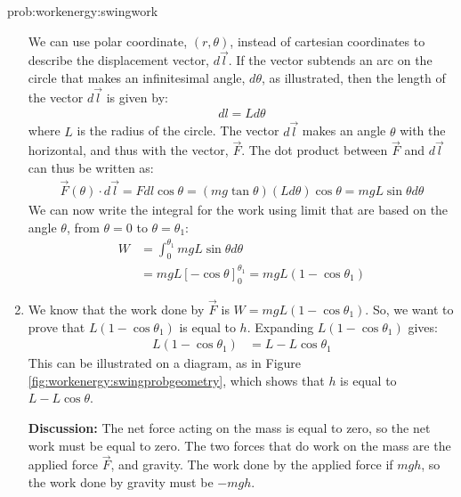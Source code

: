 \begin{solution}{prob:workenergy:swingwork}
\begin{enumerate}[label=\alph*)]
We can use polar coordinate, $(r,\theta)$, instead of cartesian coordinates to describe the displacement vector, $d\vec l$. If the vector subtends an arc on the circle that makes an infinitesimal angle, $d\theta$, as illustrated, then the length of the vector $d\vec l$ is given by:
\begin{align*}
dl = L d\theta
\end{align*}
where $L$ is the radius of the circle. The vector $d\vec l$ makes an angle $\theta$ with the horizontal, and thus with the vector, $\vec F$. The dot product between $\vec F$ and $d\vec l$ can thus be written as:
\begin{align*}
\vec F(\theta) \cdot d\vec l = Fdl\cos\theta=(mg\tan\theta)(Ld\theta)\cos\theta=mgL\sin\theta d\theta
\end{align*}
We can now write the integral for the work using limit that are based on the angle $\theta$, from $\theta=0$ to $\theta=\theta_1$:
\begin{align*}
W&=\int_0^{\theta_1}mgL\sin\theta d\theta\\
&=mgL[-\cos\theta]_0^{\theta_1}=mgL(1-\cos\theta_1)
\end{align*}

\item We know that the work done by $\vec F$ is $W=mgL(1-\cos\theta_1)$. So, we want to prove that $L(1-\cos\theta_1)$ is equal to $h$. Expanding $L(1-\cos\theta_1)$ gives:
\begin{align*}
L(1-\cos\theta_1)&=L-L\cos\theta_1
\end{align*}
This can be illustrated on a diagram, as in Figure \ref{fig:workenergy:swingprobgeometry}, which shows that $h$ is equal to $L-L\cos\theta$.

\textbf{Discussion:} The net force acting on the mass is equal to zero, so the net work must be equal to zero. The two forces that do work on the mass are the applied force $\vec F$, and gravity. The work done by the applied force if $mgh$, so the work done by gravity must be $-mgh$.
\end{enumerate}
\end{solution}

